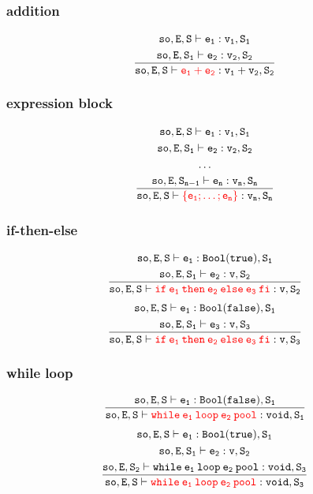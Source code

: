 \subsubsection{addition}
\begin{gather*}
\mathtt{so,E,S\vdash e_1:v_1,S_1}\\
\mathtt{\frac{so,E,S_1\vdash e_2:v_2,S_2}{so,E,S\vdash {\color{red}e_1+e_2}:v_1 + v_2,S_2}}
\end{gather*}
\subsubsection{expression block}
\begin{gather*}
\mathtt{so,E,S\vdash e_1:v_1,S_1}\\
\mathtt{so,E,S_1\vdash e_2:v_2,S_2}\\
\dots\\
\mathtt{\frac{so,E,S_{n-1}\vdash e_n:v_n,S_n}{so,E,S\vdash{\color{red}\{e_1;\dots;e_n\}}:v_n,S_n}}
\end{gather*}
\subsubsection{if-then-else}
\begin{gather*}
\mathtt{so,E,S\vdash e_1:Bool(true),S_1}\\
\mathtt{\frac{so,E,S_1\vdash e_2:v,S_2}{so,E,S\vdash{\color{red}if\:e_1\:then\:e_2\:else\:e_3\:fi}:v,S_2}}\\
\end{gather*}
\begin{gather*}
\mathtt{so,E,S\vdash e_1:Bool(false),S_1}\\
\mathtt{\frac{so,E,S_1\vdash e_3:v,S_3}{so,E,S\vdash{\color{red}if\:e_1\:then\:e_2\:else\:e_3\:fi}:v,S_3}}
\end{gather*}
\subsubsection{while loop}
\begin{gather*}
\mathtt{\frac{so,E,S\vdash e_1:Bool(false),S_1}{so,E,S\vdash{\color{red}while\:e_1\:loop\:e_2\:pool}:void,S_1}}
\end{gather*}
\begin{gather*}
\mathtt{so,E,S\vdash e_1:Bool(true),S_1}\\
\mathtt{so,E,S_1\vdash e_2:v,S_2}\\
\mathtt{\frac{so,E,S_2\vdash while\:e_1\:loop\:e_2\:pool:void,S_3}{so,E,S\vdash{\color{red}while\:e_1\:loop\:e_2\:pool}:void,S_3}}
\end{gather*}
